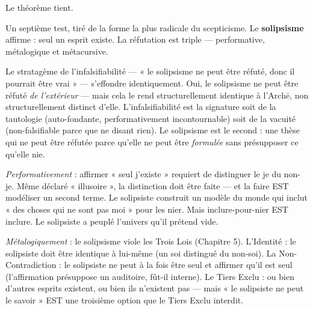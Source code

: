\documentclass[10pt, openany, oneside]{book}
\begin{document}
Le théorème tient.

Un septième test, tiré de la forme la plus radicale du scepticisme. Le \textbf{solipsisme} affirme : seul un esprit existe. La réfutation est triple --- performative, métalogique et métacursive.

Le stratagème de l'infalsifiabilité --- « le solipsisme ne peut être réfuté, donc il pourrait être vrai » --- s'effondre identiquement. Oui, le solipsisme ne peut être réfuté \textit{de l'extérieur} --- mais cela le rend structurellement identique à l'Arch\={e}, non structurellement distinct d'elle. L'infalsifiabilité est la signature soit de la tautologie (auto-fondante, performativement incontournable) soit de la vacuité (non-falsifiable parce que ne disant rien). Le solipsisme est le second : une thèse qui ne peut être réfutée parce qu'elle ne peut être \textit{formulée} sans présupposer ce qu'elle nie.

\textit{Performativement} : affirmer « seul j'existe » requiert de distinguer le je du non-je. Même déclaré « illusoire », la distinction doit être faite --- et la faire EST modéliser un second terme. Le solipsiste construit un modèle du monde qui inclut « des choses qui ne sont pas moi » pour les nier. Mais inclure-pour-nier EST inclure. Le solipsiste a peuplé l'univers qu'il prétend vide.

\textit{Métalogiquement} : le solipsisme viole les Trois Lois (Chapitre 5). L'Identité : le solipsiste doit être identique à lui-même (un soi distingué du non-soi). La Non-Contradiction : le solipsiste ne peut à la fois être seul et affirmer qu'il est seul (l'affirmation présuppose un auditoire, fût-il interne). Le Tiers Exclu : ou bien d'autres esprits existent, ou bien ils n'existent pas --- mais « le solipsiste ne peut le savoir » EST une troisième option que le Tiers Exclu interdit.
\end{document}
